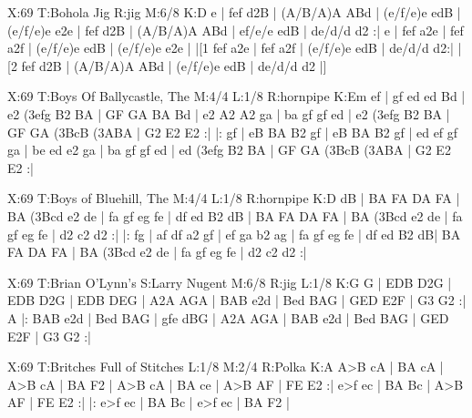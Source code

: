 \documentclass{article}
\begin{document}
\begin{abc}[name]
X:69
T:Bohola Jig
R:jig
M:6/8
K:D
e | fef d2B | (A/B/A)A ABd | (e/f/e)e edB | (e/f/e)e e2e |
fef d2B | (A/B/A)A ABd | ef/e/e edB | de/d/d d2 :|
e | fef a2e | fef a2f | (e/f/e)e edB | (e/f/e)e e2e |
|[1 fef a2e | fef a2f | (e/f/e)e edB | de/d/d d2:|
|[2 fef d2B | (A/B/A)A ABd | (e/f/e)e edB | de/d/d d2 |]
\end{abc}

\begin{abc}[name]
X:69
T:Boys Of Ballycastle, The
M:4/4
L:1/8
R:hornpipe
K:Em
ef | gf ed ed Bd | e2 (3efg B2 BA | GF GA BA Bd | e2 A2 A2 ga |
ba gf gf ed | e2 (3efg B2 BA | GF GA (3BcB (3ABA | G2 E2 E2 :|
|: gf | eB BA B2 gf | eB BA B2 gf | ed ef gf ga | be ed e2 ga  |
ba gf gf ed | ed (3efg B2 BA | GF GA (3BcB (3ABA | G2 E2 E2 :|
\end{abc}

\begin{abc}[name]
X:69
T:Boys of Bluehill, The
M:4/4
L:1/8
R:hornpipe
K:D
dB | BA FA DA FA | BA (3Bcd e2 de | fa gf eg fe | df ed B2 dB |
BA FA DA FA | BA (3Bcd e2 de | fa gf eg fe | d2 c2 d2 :|
|: fg | af df a2 gf | ef ga b2 ag | fa gf eg fe | df ed B2 dB|
BA FA DA FA | BA (3Bcd e2 de | fa gf eg fe | d2 c2 d2 :|
\end{abc}

\begin{abc}[name]
X:69
T:Brian O'Lynn's
S:Larry Nugent
M:6/8
R:jig
L:1/8
K:G
G | EDB D2G | EDB D2G | EDB DEG | A2A AGA |
BAB e2d | Bed BAG | GED E2F | G3 G2 :|
A |: BAB e2d | Bed BAG | gfe dBG | A2A AGA |
BAB e2d | Bed BAG | GED E2F | G3 G2 :|
\end{abc}

\begin{abc}[name]
X:69
T:Britches Full of Stitches
L:1/8
M:2/4
R:Polka
K:A
A>B cA | BA cA | A>B cA | BA F2 |
A>B cA | BA ce | A>B AF | FE E2 :|
e>f ec | BA Bc | A>B AF | FE E2 :|
|: e>f ec | BA Bc | e>f ec | BA F2 |
\end{abc}
\end{document}
